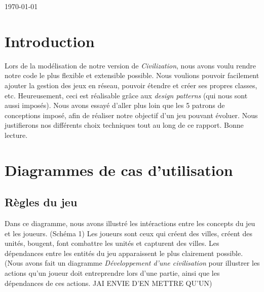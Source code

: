 \begin{titlepage}

{\large \today}\\[3cm] %


 

\vfill %

\end{titlepage}

\tableofcontents{}

\section{Introduction}

	Lors de la modélisation de notre version de \textit{Civilization}, nous avons voulu rendre notre code le plus flexible et extensible possible.
Nous voulions pouvoir facilement ajouter la gestion des jeux en réseau, pouvoir étendre et créer ses propres classes, etc.
Heureusement, ceci est réalisable grâce aux \textit{design patterns} (qui nous sont aussi imposés).
Nous avons essayé d'aller plus loin que les 5 patrons de conceptions imposé, afin de réaliser notre objectif d'un jeu pouvant évoluer. Nous justifierons nos différents choix techniques tout au long de ce rapport.
Bonne lecture.

\newpage

\section{Diagrammes de cas d'utilisation}
	\subsection{Règles du jeu}
		Dans ce diagramme, nous avons illustré les intéractions entre les concepts du jeu et les joueurs. (Schéma 1)
	Les joueurs sont ceux qui créent des villes, créent des unités, bougent, font combattre les unités et capturent des villes.
	Les dépendances entre les entités du jeu apparaissent le plus clairement possible.
	(Nous avons fait un diagramme \textit{Développement d'une civilisation} pour illustrer les actions qu'un joueur doit entreprendre lors d'une partie,
	ainsi que les dépendances de ces actions. JAI ENVIE D'EN METTRE QU'UN)
	
